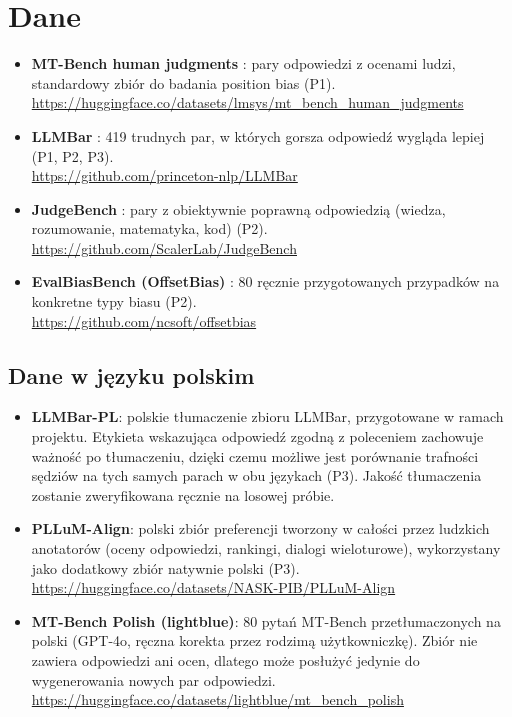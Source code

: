 \documentclass[11pt,a4paper]{article}
\begin{document}
\section*{Dane}
\begin{itemize}[leftmargin=1.5em]
  \item \textbf{MT-Bench human judgments} \cite{zhengetal2023c}: pary odpowiedzi z ocenami ludzi, standardowy zbiór do badania position bias (P1).\\
  \url{https://huggingface.co/datasets/lmsys/mt_bench_human_judgments}
  \item \textbf{LLMBar} \cite{ICLR2024_afc8b034}: 419 trudnych par, w których gorsza odpowiedź wygląda lepiej (P1, P2, P3).\\
  \url{https://github.com/princeton-nlp/LLMBar}
  \item \textbf{JudgeBench} \cite{ICLR2025_9e720fce}: pary z obiektywnie poprawną odpowiedzią (wiedza, rozumowanie, matematyka, kod) (P2).\\
  \url{https://github.com/ScalerLab/JudgeBench}
  \item \textbf{EvalBiasBench (OffsetBias)} \cite{parketal2024a}: 80 ręcznie przygotowanych przypadków na konkretne typy biasu (P2).\\
  \url{https://github.com/ncsoft/offsetbias}
\end{itemize}

\subsection*{Dane w języku polskim}
\begin{itemize}[leftmargin=1.5em]
  \item \textbf{LLMBar-PL}: polskie tłumaczenie zbioru LLMBar, przygotowane w ramach projektu. Etykieta wskazująca odpowiedź zgodną z poleceniem zachowuje ważność po tłumaczeniu, dzięki czemu możliwe jest porównanie trafności sędziów na tych samych parach w obu językach (P3). Jakość tłumaczenia zostanie zweryfikowana ręcznie na losowej próbie.
  \item \textbf{PLLuM-Align}: polski zbiór preferencji tworzony w całości przez ludzkich anotatorów (oceny odpowiedzi, rankingi, dialogi wieloturowe), wykorzystany jako dodatkowy zbiór natywnie polski (P3).\\
  \url{https://huggingface.co/datasets/NASK-PIB/PLLuM-Align}
  \item \textbf{MT-Bench Polish (lightblue)}: 80 pytań MT-Bench przetłumaczonych na polski (GPT-4o, ręczna korekta przez rodzimą użytkowniczkę). Zbiór nie zawiera odpowiedzi ani ocen, dlatego może posłużyć jedynie do wygenerowania nowych par odpowiedzi.\\
  \url{https://huggingface.co/datasets/lightblue/mt_bench_polish}
\end{itemize}


\printbibliography[title=Bibliografia]
\end{document}
